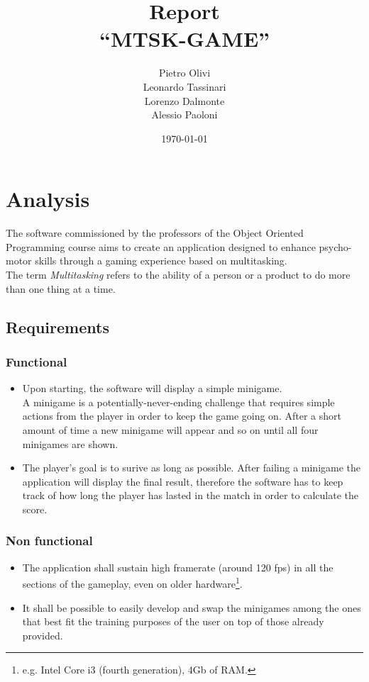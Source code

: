 \documentclass[a4paper,12pt]{report}
\title{Report\\``MTSK-GAME''}
\author{Pietro Olivi\\
Leonardo Tassinari\\
Lorenzo Dalmonte\\
Alessio Paoloni}
\date{\today}
\begin{document}
\maketitle

\tableofcontents

\chapter{Analysis}
The software commissioned by the professors of the Object Oriented Pro\-gramming course aims to create an application designed to enhance psycho-motor skills through a gaming experience based on multitasking.\\
The term \textit{Multitasking} refers to the ability of a person or a product to do more than one thing at a time.

\section{Requirements}
\subsection*{Functional}
\begin{itemize}
	\item Upon starting, the software will display a simple minigame.\\
	A minigame is a potentially-never-ending challenge that requires simple actions from the player in order to keep the game going on.
	After a short amount of time a new minigame will appear and so on until all four minigames are shown.
	\item The player's goal is to surive as long as possible. After failing a minigame the application will display the final result, 
  therefore the software has to keep track of how long the player has lasted in the match in order to calculate the score.
\end{itemize}

\subsection*{Non functional}
\begin{itemize}
	\item The application shall sustain high framerate (around 120 fps) in all the sections of the gameplay, even on older hardware\footnote{e.g. Intel Core i3 (fourth generation), 4Gb of RAM.}.
	\item It shall be possible to easily develop and swap the minigames among the ones that best fit the training purposes of the user on top of those already provided. 
\end{itemize}
\end{document}
